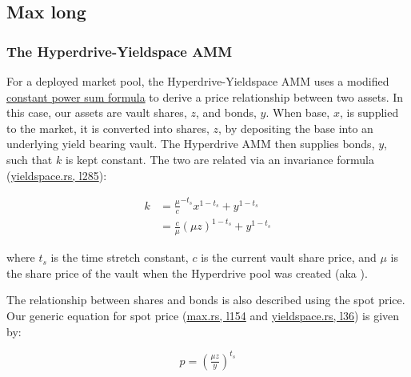 \subsection{Max long}

\subsubsection{The Hyperdrive-Yieldspace AMM}

For a deployed market pool, the Hyperdrive-Yieldspace AMM uses a modified \href{https://yield.is/YieldSpace.pdf}{constant power sum formula} to derive a price relationship between two assets.
In this case, our assets are vault shares, $z$, and bonds, $y$.
When base, $x$, is supplied to the market, it is converted into shares, $z$, by depositing the base into an underlying yield bearing vault.
The Hyperdrive AMM then supplies bonds, $y$, such that $k$ is kept constant.
The two are related via an invariance formula (\href{https://github.com/delvtech/hyperdrive/blob/f410574fffcb8b2556208c158494ba2972525843/crates/hyperdrive-math/src/yield_space.rs#L285}{yieldspace.rs, l285}):

\begin{equation}\label{keq}
\begin{aligned}
k &= \tfrac{\mu}{c}^{-t_{s}} x^{1 - t_{s}} + y^{1 - t_{s}} \\
&= \tfrac{c}{\mu} (\mu z)^{1 - t_{s}} + y^{1 - t_{s}}
\end{aligned}
\end{equation}

where $t_{s}$ is the time stretch constant, $c$ is the current vault share price, and $\mu$ is the share price of the vault when the Hyperdrive pool was created (aka ).

The relationship between shares and bonds is also described using the spot price.
Our generic equation for spot price (\href{https://github.com/delvtech/hyperdrive/blob/34b562e8952cf9cf235e551484790bbc7ff65884/crates/hyperdrive-math/src/long/max.rs#L154}{max.rs, l154} and \href{https://github.com/delvtech/hyperdrive/blob/570263e2b85c411b4097132bfe7ad2a085e3180b/crates/hyperdrive-math/src/yield_space.rs#L36-L37}{yieldspace.rs, l36}) is given by:

\begin{equation}\label{simple-price}
p = \left( \tfrac{\mu z}{y} \right)^{t_s}
\end{equation}

